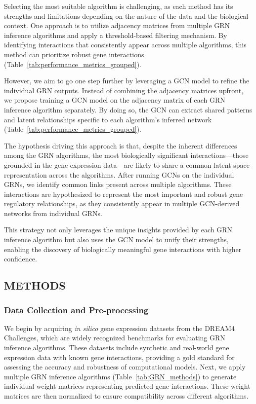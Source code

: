 \documentclass{article}
\begin{document}
Selecting the most suitable algorithm is challenging, as each method has its strengths and limitations depending on the nature of the data and the biological context. One approach is to utilize adjacency matrices from multiple GRN inference algorithms and apply a threshold-based filtering mechanism. By identifying interactions that consistently appear across multiple algorithms, this method can prioritize robust gene interactions (Table~\ref{tab:performance_metrics_grouped}).

However, we aim to go one step further by leveraging a GCN model to refine the individual GRN outputs. Instead of combining the adjacency matrices upfront, we propose training a GCN model on the adjacency matrix of each GRN inference algorithm separately. By doing so, the GCN can extract shared patterns and latent relationships specific to each algorithm's inferred network (Table~\ref{tab:performance_metrics_grouped}).

The hypothesis driving this approach is that, despite the inherent differences among the GRN algorithms, the most biologically significant interactions—those grounded in the gene expression data—are likely to share a common latent space representation across the algorithms. After running GCNs on the individual GRNs, we identify common links present across multiple algorithms. These interactions are hypothesized to represent the most important and robust gene regulatory relationships, as they consistently appear in multiple GCN-derived networks from individual GRNs.

This strategy not only leverages the unique insights provided by each GRN inference algorithm but also uses the GCN model to unify their strengths, enabling the discovery of biologically meaningful gene interactions with higher confidence.

\subsection{METHODS}

\subsubsection{Data Collection and Pre-processing}

We begin by acquiring \textit{in silico} gene expression datasets from the DREAM4 Challenges, which are widely recognized benchmarks for evaluating GRN inference algorithms. These datasets include synthetic and real-world gene expression data with known gene interactions, providing a gold standard for assessing the accuracy and robustness of computational models. Next, we apply multiple GRN inference algorithms (Table~\ref{tab:GRN_methods}) to generate individual weight matrices representing predicted gene interactions. These weight matrices are then normalized to ensure compatibility across different algorithms.
\end{document}
